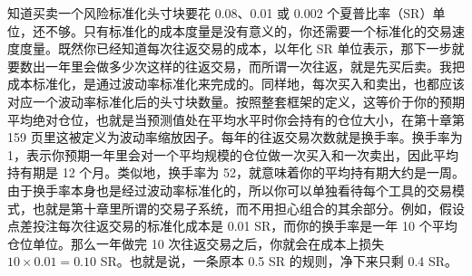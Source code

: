 \begin{chineseblock}知道买卖一个风险标准化头寸块要花 0.08、0.01 或 0.002 个夏普比率（SR）单位，还不够。只有标准化的成本度量是没有意义的，你还需要一个标准化的交易速度度量。既然你已经知道每次往返交易的成本，以年化 SR 单位表示，那下一步就要数出一年里会做多少次这样的往返交易，而所谓一次往返，就是先买后卖。我把成本标准化，是通过波动率标准化来完成的。同样地，每次买入和卖出，也都应该对应一个波动率标准化后的头寸块数量。按照整套框架的定义，这等价于你的预期平均绝对仓位，也就是当预测值处在平均水平时你会持有的仓位大小，在第十章第 159 页里这被定义为波动率缩放因子。每年的往返交易次数就是换手率。换手率为 1，表示你预期一年里会对一个平均规模的仓位做一次买入和一次卖出，因此平均持有期是 12 个月。类似地，换手率为 52，就意味着你的平均持有期大约是一周。由于换手率本身也是经过波动率标准化的，所以你可以单独看待每个工具的交易模式，也就是第十章里所谓的交易子系统，而不用担心组合的其余部分。例如，假设点差投注每次往返交易的标准化成本是 0.01 SR，而你的换手率是一年 10 个平均仓位单位。那么一年做完 10 次往返交易之后，你就会在成本上损失 \(10 \times 0.01 = 0.10\) SR。也就是说，一条原本 0.5 SR 的规则，净下来只剩 0.4 SR。 \end{chineseblock}


